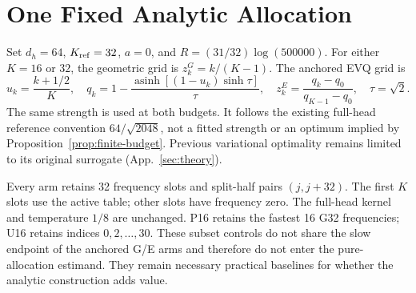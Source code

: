 \section{One Fixed Analytic Allocation}
\label{sec:budget-method}

Set $d_h=64$, $K_{\rm ref}=32$, $a=0$, and
$R=(31/32)\log(500000)$. For either $K=16$ or $32$, the geometric grid is
$z_k^G=k/(K-1)$. The anchored EVQ grid is
\begin{equation}
u_k=\frac{k+1/2}{K},\quad
q_k=1-\frac{\operatorname{asinh}[(1-u_k)\sinh\tau]}{\tau},\quad
z_k^E=\frac{q_k-q_0}{q_{K-1}-q_0},\quad \tau=\sqrt2.
\end{equation}
The same strength is used at both budgets. It follows the existing full-head
reference convention $64/\sqrt{2048}$, not a fitted strength or an optimum
implied by Proposition~\ref{prop:finite-budget}. Previous variational
optimality remains limited to its original surrogate
(App.~\ref{sec:theory}).

Every arm retains 32 frequency slots and split-half pairs $(j,j+32)$.
The first $K$ slots use the active table; other slots have frequency zero.
The full-head kernel and temperature $1/8$ are unchanged. P16 retains the
fastest 16 G32 frequencies; U16 retains indices $0,2,\ldots,30$. These subset
controls do not share the slow endpoint of the anchored G/E arms and therefore
do not enter the pure-allocation estimand. They remain necessary practical
baselines for whether the analytic construction adds value.

